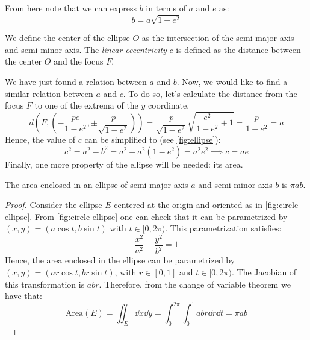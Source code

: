 \documentclass[../main.tex]{subfiles}
\begin{document}
\begin{figure}[ht]

\end{figure}
From here note that we can express $b$ in terms of $a$ and $e$ as:
\begin{equation}\label{eq:ellipse_b_a}
  b=a\sqrt{1-e^2}
\end{equation}
\begin{definition}
  We define the center of the ellipse $O$ as the intersection of the semi-major axis and semi-minor axis. The \emph{linear eccentricity} $c$ is defined as the distance between the center $O$ and the focus $F$.
\end{definition}
We have just found a relation between $a$ and $b$. Now, we would like to find a similar relation between $a$ and $c$. To do so, let's calculate the distance from the focus $F$ to one of the extrema of the $y$ coordinate.
\begin{equation}
  d\left(F,\left(-\frac{pe}{1-e^2},\pm \frac{p}{\sqrt{1-e^2}}\right)\right)=\frac{p}{\sqrt{1-e^2}}\sqrt{\frac{e^2}{1-e^2}+1}=\frac{p}{1-e^2}=a
\end{equation}
Hence, the value of $c$ can be simplified to (see \cref{fig:ellipse}):
\begin{equation}
  c^2=a^2-b^2=a^2-a^2(1-e^2)=a^2e^2\implies c=ae
\end{equation}
Finally, one more property of the ellipse will be needed: its area.
\begin{proposition}
  The area enclosed in an ellipse of semi-major axis $a$ and semi-minor axis $b$ is $\pi a b$.
\end{proposition}
\begin{proof}
  Consider the ellipse $E$ centered at the origin and oriented as in \cref{fig:circle-ellipse}. From \cref{fig:circle-ellipse} one can check that it can be parametrized by $(x,y)=(a\cos t,b\sin t)$ with $ t\in[0,2\pi)$. This parametrization satisfies:
  \begin{equation}
    \frac{x^2}{a^2}+\frac{y^2}{b^2}=1
  \end{equation}
  Hence, the area enclosed in the ellipse can be parametrized by $(x, y)=(ar\cos t,br\sin t)$, with $r\in[0,1]$ and $t\in[0,2\pi)$. The Jacobian of this transformation is $abr$. Therefore, from the change of variable theorem we have that:
  \begin{equation}
    \mathrm{Area}(E)=\iint_E\dd{x}\dd{y}=\int_{0}^{2\pi}\int_{0}^{1}abr\dd{r}\dd{t}=\pi ab
  \end{equation}
\end{proof}
\end{document}
